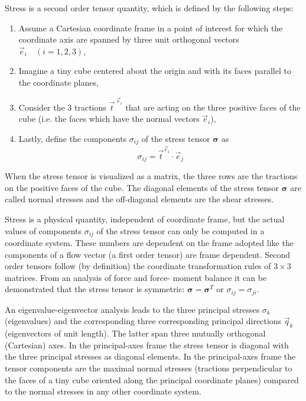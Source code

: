 Stress is a second order tensor quantity, which is defined by the following steps:
\begin{enumerate}
\item 
Assume a Cartesian coordinate frame in a point of interest for which the coordinate
axis are spanned by three unit orthogonal vectors $\vec{e}_i \quad (i = 1,2,3)$,
\item Imagine a tiny cube centered about the origin and with its faces parallel to the
coordinate planes,
\item Consider the 3 tractions $\vec{t}^{\;\vec{e}_i}$ that are acting on the three positive 
faces of the cube (i.e. the faces which have the normal vectors $\vec{e}_i$),
\item Lastly, define the components $\sigma_{ij}$ of the stress tensor ${\bm \sigma}$ as
\begin{equation}
\sigma_{ij} = \vec{t}^{\vec{e}_i} \cdot \vec{e}_j
\label{eq:md01}
\end{equation}
\end{enumerate}
When the stress tensor is visualized as a matrix, the three rows are 
the tractions on the
positive faces of the cube. The diagonal elements of the stress tensor 
${\bm \sigma}$ are called
normal stresses and the off-diagonal elements are the shear stresses.

Stress is a physical quantity, independent of coordinate frame, but the actual values of
components $\sigma_{ij}$ of the stress tensor can only be computed in 
a coordinate system. These
numbers are dependent on the frame adopted like the components of a flow vector (a first
order tensor) are frame dependent. Second order tensors follow (by definition) the
coordinate transformation rules of $3 \times 3$ matrices. From an analysis of force and force-
moment balance it can be demonstrated that the stress tensor is symmetric: 
${\bm \sigma} = {\bm \sigma}^T$ or $\sigma_{ij}=\sigma_{ji}$. 

An eigenvalue-eigenvector analysis leads to the three principal stresses $\sigma_k$ (eigenvalues) and
the corresponding three corresponding principal directions $\vec{q}_k$ (eigenvectors of unit
length). The latter span three mutually orthogonal (Cartesian) axes. In the principal-axes
frame the stress tensor is diagonal with the three principal stresses as diagonal elements.
In the principal-axes frame the tensor components are the maximal normal stresses
(tractions perpendicular to the faces of a tiny cube oriented along the principal coordinate
planes) compared to the normal stresses in any other coordinate system.

